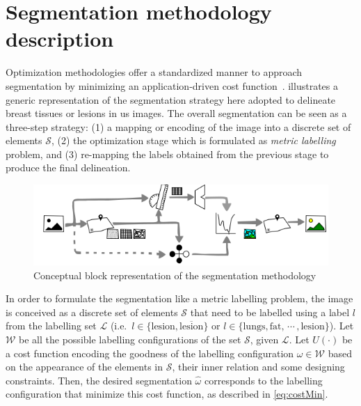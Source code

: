 \graphicspath{ {./content/method/figures/} }

\section{Segmentation methodology description} 

Optimization methodologies offer a standardized manner to approach segmentation by minimizing an application-driven cost function~\cite{cremers2007review}.
 illustrates a generic representation of the segmentation strategy here adopted to delineate breast tissues or lesions in \ac{us} images. 
The overall segmentation can be seen as a three-step strategy: 
(1) a mapping or encoding of the image into a discrete set of elements $\mathcal{S}$, 
(2) the optimization stage which is formulated as \emph{metric labelling} problem, 
and (3) re-mapping the labels obtained from the previous stage to produce the final delineation. 

\begin{figure}[htpb]
  \centering
  \includegraphics[width=0.9\linewidth]{method}
  \caption{Conceptual block representation of the segmentation methodology}
  \label{fig:method}
\end{figure}

In order to formulate the segmentation like a metric labelling problem, the image is conceived as a discrete set of elements $\mathcal{S}$ that need to be labelled using a label $l$ from the labelling set $\mathcal{L}$ 
(i.e.\, $l \in \{\text{lesion}, \overline{\text{lesion}}\}$ 
or $l \in \{\text{lungs}, \text{fat},\,\cdots\,, \text{lesion}\}$).
Let $\mathcal{W}$ be all the possible labelling configurations of the set $\mathcal{S}$, given $\mathcal{L}$.
Let $U(\cdot)$ be a cost function encoding the goodness of the labelling configuration $\omega \in \mathcal{W}$ based on the appearance of the elements in $\mathcal{S}$, their inner relation and some designing constraints.
Then, the desired segmentation $\hat{\omega}$ corresponds to the labelling configuration that minimize this cost function, as described in \cref{eq:costMin}.

